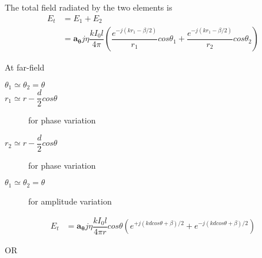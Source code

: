 \documentclass{beamer}
\begin{document}
	\begin{frame}
		\begin{itemize}
			\item The total field radiated by the two
			elements is
			\begin{align}
			E_t &= E_1 + E_2 \nonumber\\
			&= \mathbf{a_\theta}j\eta\dfrac{kI_0 l}{4\pi }\left(\dfrac{e^{-j(kr_1 - \beta/2)}}{r_1}cos\theta_1 + \dfrac{e^{-j(kr_1 - \beta/2)}}{r_2}cos\theta_2 \right)
			\end{align}
				\begin{align}
				E_t&= \mathbf{a_\theta}j\eta\dfrac{kI_0 l}{4\pi r}cos\theta\left(e^{+j(kdcos\theta + \beta)/2} + e^{-j(kdcos\theta + \beta)/2} \right)\nonumber
				\end{align}
				\begin{center}
					OR
				\end{center}
			\end{description}
		\end{itemize}
	\end{frame}
\end{document}

